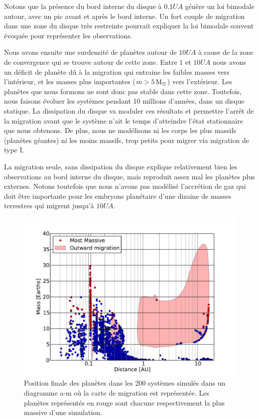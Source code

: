 Notons que la présence du bord interne du disque à $0.1\unit{UA}$ génère un loi bimodale autour, avec un pic avant et après le
bord interne. Un fort couple de migration dans une zone du disque très restreinte pourrait expliquer la loi bimodale souvent
évoquée pour représenter les observations. 

Nous avons ensuite une surdensité de planètes autour de $10\unit{UA}$ à cause de la zone de convergence qui se trouve autour de
cette zone. Entre $1$ et $10\unit{UA}$ nous avons un déficit de planète dû à la migration qui entraine les faibles masses vers
l'intérieur, et les masses plus importantes ($m>5\mathrm{\thinspace M_\oplus}$) vers l'extérieur. Les planètes que nous formons ne sont donc pas
stable dans cette zone. Toutefois, nous faisons évoluer les systèmes pendant 10 millions d'années, dans un disque statique. La
dissipation du disque va moduler ces résultats et permettre l'arrêt de la migration avant que le système n'ait le temps
d'atteindre l'état stationnaire que nous obtenons. De plus, nous ne modélisons ni les corps les plus massifs (planètes géantes)
ni les moins massifs, trop petits pour migrer via migration de type I.

La migration seule, sans dissipation du disque explique relativement bien les observations au bord interne du disque, mais reproduit assez mal les planètes plus externes. Notons toutefois que nous n'avons pas modélisé l'accrétion de gaz qui doit être importante pour les embryons planétaire d'une dizaine de masses terrestres qui migrent jusqu'à $10\unit{UA}$. 

\begin{figure}[htbp]
\centering
\includegraphics[width=0.8\linewidth]{figure/HSE/m_fct_a.pdf}
\caption{Position finale des planètes dans les 200 systèmes simulés dans un diagramme a-m où la carte de migration est représentée. Les planètes représentés en rouge sont chacune respectivement la plus massive d'une simulation.}\label{fig:HSE_fid_mfcta}
\end{figure}

